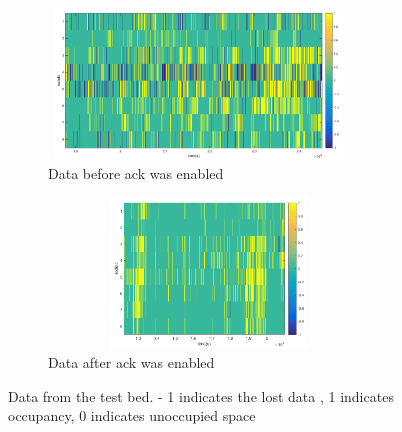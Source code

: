 \begin{figure}[!ht]
    \centering
    \begin{subfigure}[b]{1\textwidth}
        \centering
        \includegraphics[width=8cm,height=4cm]{./pics/packetLoss.png}
      \caption{Data before ack was enabled}
       \label{fig:ackDis}
    \end{subfigure}
    \hfill
    \begin{subfigure}[b]{1\textwidth}
        \centering
        \includegraphics[width=8.5cm,height=4cm]{./pics/dataAfterAck.png}
        \caption{Data after ack was enabled}
        \label{fig:ackEnb}
    \end{subfigure}
\caption{Data from the test bed. - 1 indicates the lost data , 1 indicates occupancy, 0 indicates unoccupied space}
\label{fig:packetLoss}
\end{figure}

